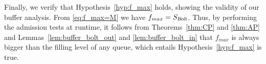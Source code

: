 Finally, we verify that Hypothesis~\ref{hyp:f_max} holds, showing the validity of our buffer analysis. From \eqref{eq:f_max=M} we have $f_{max} = S_{\textsl{Bolt}}$. Thus, by performing the admission tests at runtime, it follows from Theorems~\ref{thm:CP} and \ref{thm:AP} and Lemmas~\ref{lem:buffer_bolt_out} and \ref{lem:buffer_bolt_in} that $f_{max}$ is always bigger than the filling level of any \bolt queue, which entails Hypothesis~\ref{hyp:f_max} is true.
